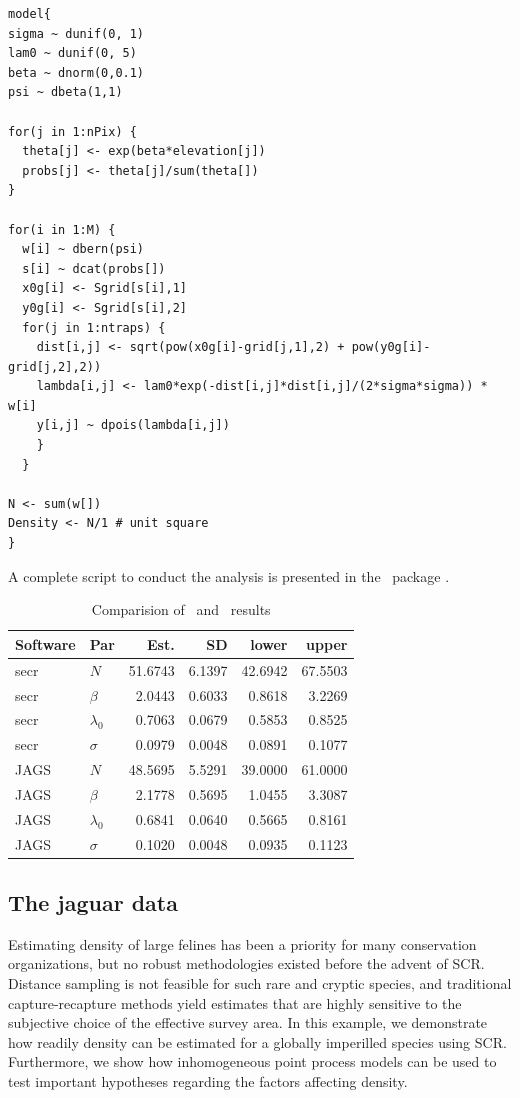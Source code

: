 \begin{verbatim}
model{
sigma ~ dunif(0, 1)
lam0 ~ dunif(0, 5)
beta ~ dnorm(0,0.1)
psi ~ dbeta(1,1)

for(j in 1:nPix) {
  theta[j] <- exp(beta*elevation[j])
  probs[j] <- theta[j]/sum(theta[])
}

for(i in 1:M) {
  w[i] ~ dbern(psi)
  s[i] ~ dcat(probs[])
  x0g[i] <- Sgrid[s[i],1]
  y0g[i] <- Sgrid[s[i],2]
  for(j in 1:ntraps) {
    dist[i,j] <- sqrt(pow(x0g[i]-grid[j,1],2) + pow(y0g[i]-grid[j,2],2))
    lambda[i,j] <- lam0*exp(-dist[i,j]*dist[i,j]/(2*sigma*sigma)) * w[i]
    y[i,j] ~ dpois(lambda[i,j])
    }
  }

N <- sum(w[])
Density <- N/1 # unit square
}
\end{verbatim}

A complete script to conduct the analysis is presented in the
\R~package
.







\begin{table}
\centering
\caption{Comparision of \jags~and \secr~results}
\begin{tabular}{llrrrr}
\hline
Software & Par & Est. & SD & lower & upper \\
\hline
 secr & $N$ & 51.6743 & 6.1397 & 42.6942 & 67.5503 \\
 secr & $\beta$ &  2.0443 & 0.6033 &  0.8618 &  3.2269 \\
 secr & $\lambda_0$ &  0.7063 & 0.0679 &  0.5853 &  0.8525 \\
 secr & $\sigma$ &  0.0979 & 0.0048 &  0.0891 &  0.1077 \\
 JAGS & $N$ & 48.5695 & 5.5291 & 39.0000 & 61.0000 \\
 JAGS & $\beta$ &  2.1778 & 0.5695 &  1.0455 &  3.3087 \\
 JAGS & $\lambda_0$ &  0.6841 & 0.0640 &  0.5665 &  0.8161 \\
 JAGS & $\sigma$ &  0.1020 & 0.0048 &  0.0935 &  0.1123 \\
\hline
\end{tabular}
\label{ch9:tab:simIPP}
\end{table}



\subsection{The jaguar data}

Estimating density of large felines has been a priority for many
conservation organizations, but no robust methodologies existed before
the advent of SCR. Distance sampling is not feasible for such rare and
cryptic species, and traditional capture-recapture methods yield
estimates that are highly sensitive to the subjective choice of the
effective survey area. In this example, we
demonstrate how readily density can be estimated for a
globally imperilled species using SCR. Furthermore, we show how
inhomogeneous point process models can be used to test important
hypotheses regarding the factors affecting density.

